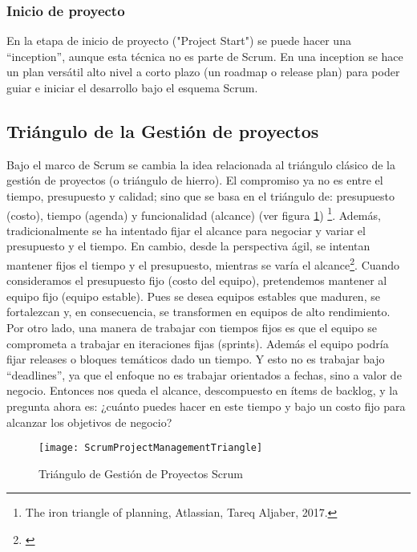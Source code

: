 \subsubsection{Inicio de proyecto}

En la etapa de inicio de proyecto ("Project Start") se puede hacer una “inception”, aunque esta técnica no es parte de Scrum. En una inception se hace un plan versátil alto nivel a corto plazo (un roadmap o release plan) para poder guiar e iniciar el desarrollo bajo el esquema Scrum.

\subsection{Triángulo de la Gestión de proyectos}

Bajo el marco de Scrum se cambia la idea relacionada al triángulo clásico de la gestión de proyectos (o triángulo de hierro). El compromiso ya no es entre el tiempo, presupuesto y calidad; sino que se basa en el triángulo de: presupuesto (costo), tiempo (agenda) y funcionalidad (alcance) (ver figura \ref{fig:ScrumProjectManagementTriangle}) \footnote{The iron triangle of planning, Atlassian, Tareq Aljaber, 2017.}. Además, tradicionalmente se ha intentado fijar el alcance para negociar y variar el presupuesto y el tiempo. En cambio, desde la perspectiva ágil, se intentan mantener fijos el tiempo y el presupuesto, mientras se varía el alcance\footnote{\cite{Martin-Alaimo-2014}}. Cuando consideramos el presupuesto fijo (costo del equipo), pretendemos mantener al equipo fijo (equipo estable). Pues se desea equipos estables que maduren, se fortalezcan y, en consecuencia, se transformen en equipos de alto rendimiento. Por otro lado, una manera de trabajar con tiempos fijos es que el equipo se comprometa a trabajar en iteraciones fijas (sprints). Además el equipo podría fijar releases o bloques temáticos dado un tiempo. Y esto no es trabajar bajo “deadlines”, ya que el enfoque no es trabajar orientados a fechas, sino a valor de negocio. Entonces nos queda el alcance, descompuesto en ítems de backlog, y la pregunta ahora es: ¿cuánto puedes hacer en este tiempo y bajo un costo fijo para alcanzar los objetivos de negocio?

\begin{figure}[h]
  \centering
  \texttt{[image: ScrumProjectManagementTriangle]}
  \caption{Triángulo de Gestión de Proyectos Scrum}
  \centering
  \label{fig:ScrumProjectManagementTriangle} %
\end{figure}

